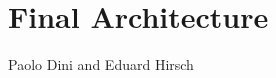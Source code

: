 \chapter{Final Architecture}
\label{ch:finarch}

\vspace{-1cm}
\begin{center}
Paolo Dini and Eduard Hirsch
\end{center}















\newpage











